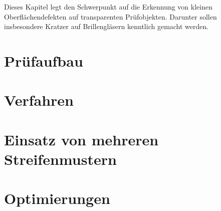 Dieses Kapitel legt den Schwerpunkt auf die Erkennung von kleinen Oberflächendefekten auf transparenten Prüfobjekten.
Darunter sollen insbesondere Kratzer auf Brillengläsern kenntlich gemacht werden.

{
	\FloatBarrier
    \section{Prüfaufbau}
    \label{sec:pruefaufbau}
    
}

{
	\FloatBarrier
    \section{Verfahren}
    \label{sec:verfahren}
    
}

{
	\FloatBarrier
    \section{Einsatz von mehreren Streifenmustern}
    \label{sec:einsatzVonMehrerenStreifenmustern}
    
}

{
	\FloatBarrier
    \section{Optimierungen}
    \label{sec:optimierungen}
    
}
